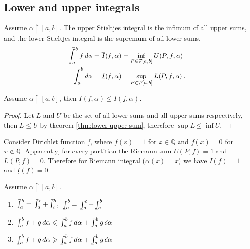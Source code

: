 \documentclass{article}
\newcommand{\upI}{\overline{I}}
\newcommand{\lowI}{\underline{I}}
\newcommand{\Partition}{\mathcal P}
\newcommand{\dd}{\mathop{}\!d}
\newcommand{\increasing}{\uparrow}
\def\upint{\mathchoice%
    {\mkern13mu\overline{\vphantom{\intop}\mkern7mu}\mkern-20mu}%
    {\mkern7mu\overline{\vphantom{\intop}\mkern7mu}\mkern-14mu}%
    {\mkern7mu\overline{\vphantom{\intop}\mkern7mu}\mkern-14mu}%
    {\mkern7mu\overline{\vphantom{\intop}\mkern7mu}\mkern-14mu}%
  \int}
\def\lowint{\mkern3mu\underline{\vphantom{\intop}\mkern7mu}\mkern-10mu\int}
\begin{document}
\subsection{Lower and upper integrals}
\begin{definition}
    Assume $ \alpha \increasing [a, b] $. The upper Stieltjes integral is the infimum of all upper sums, and the lower Stieltjes integral is the supremum of all lower sums.
    \begin{align*}
        \upint_a^b f \dd \alpha = \upI (f, \alpha) &= \inf_{P \in \Partition[a, b]} U(P, f, \alpha) \, \\
        \lowint_a^b \dd \alpha = \lowI (f, \alpha) &= \sup_{P \in \Partition[a, b]} L(P, f, \alpha) \,.
    \end{align*}
\end{definition}

\begin{theorem}
    Assume $ \alpha \increasing [a, b] $, then $ \lowI (f, \alpha) \leqslant \upI (f, \alpha) $.
\end{theorem}

\begin{proof}
    Let $ L $ and $ U $ be the set of all lower sums and all upper sums respectively, then $ L \leqslant U $ by theorem \ref{thm:lower-upper-sum}, therefore $ \sup L \leqslant \inf U $.
\end{proof}

\begin{example}[$ \upI \neq \lowI $]
    Consider Dirichlet function $ f $, where $ f(x) = 1 $ for $ x \in \mathbb Q $ and $ f(x) = 0 $ for $ x \not\in \mathbb Q $. Apparently, for every partition the Riemann sum $ U(P, f) = 1 $ and $ L(P, f) = 0 $. Therefore for Riemann integral ($ \alpha(x) = x $) we have $ \upI(f) = 1 $ and $ \lowI(f) = 0 $.
\end{example}

\begin{theorem} Assume $ \alpha \increasing [a, b] $.
    \begin{enumerate}
        \item $ \upint_a^b = \upint_a^c + \upint_c^b $, $ \lowint_a^b = \lowint_a^c + \lowint_c^b $
        \item $ \upint_a^b f + g \dd \alpha \leqslant \upint_a^b f \dd \alpha + \upint_a^b g \dd \alpha $
        \item $ \lowint_a^b f + g \dd \alpha \geqslant \lowint_a^b f \dd \alpha + \lowint_a^b g \dd \alpha $
    \end{enumerate}
\end{theorem}
\end{document}
